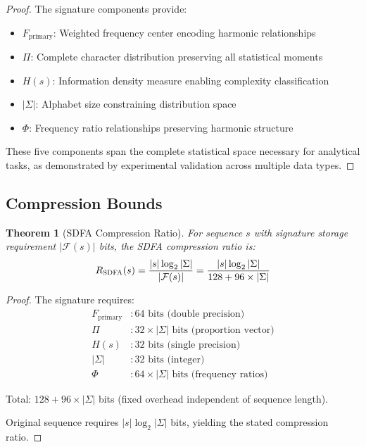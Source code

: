 \documentclass[12pt]{article}
\newtheorem{theorem}{Theorem}
\newcommand{\sdfa}{\textsc{SDFA}}
\newcommand{\Entropy}[1]{H\left(#1\right)}
\newcommand{\FreqMap}{\mathcal{F}}
\begin{document}
\begin{proof}
The signature components provide:
\begin{itemize}
\item $F_{\text{primary}}$: Weighted frequency center encoding harmonic relationships
\item $\Pi$: Complete character distribution preserving all statistical moments
\item $\Entropy{s}$: Information density measure enabling complexity classification
\item $|\Sigma|$: Alphabet size constraining distribution space
\item $\Phi$: Frequency ratio relationships preserving harmonic structure
\end{itemize}

These five components span the complete statistical space necessary for analytical tasks, as demonstrated by experimental validation across multiple data types.
\end{proof}

\subsection{Compression Bounds}

\begin{theorem}[\sdfa{} Compression Ratio]
For sequence $s$ with signature storage requirement $|\FreqMap(s)|$ bits, the \sdfa{} compression ratio is:
\begin{equation}
R_{\sdfa}(s) = \frac{|s| \log_2 |\Sigma|}{|\FreqMap(s)|} = \frac{|s| \log_2 |\Sigma|}{128 + 96 \times |\Sigma|}
\end{equation}
\end{theorem}

\begin{proof}
The signature requires:
\begin{align}
F_{\text{primary}} &: 64 \text{ bits (double precision)} \\
\Pi &: 32 \times |\Sigma| \text{ bits (proportion vector)} \\
\Entropy{s} &: 32 \text{ bits (single precision)} \\
|\Sigma| &: 32 \text{ bits (integer)} \\
\Phi &: 64 \times |\Sigma| \text{ bits (frequency ratios)}
\end{align}

Total: $128 + 96 \times |\Sigma|$ bits (fixed overhead independent of sequence length).

Original sequence requires $|s| \log_2 |\Sigma|$ bits, yielding the stated compression ratio.
\end{proof}
\end{document}
